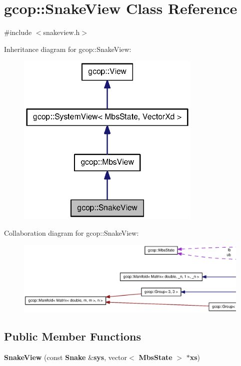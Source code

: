 \section{gcop\-:\-:\-Snake\-View \-Class \-Reference}
\label{classgcop_1_1SnakeView}


{\ttfamily \#include $<$snakeview.\-h$>$}



\-Inheritance diagram for gcop\-:\-:\-Snake\-View\-:\nopagebreak
\begin{figure}[H]
\begin{center}
\leavevmode
\includegraphics[width=250pt]{classgcop_1_1SnakeView__inherit__graph}
\end{center}
\end{figure}


\-Collaboration diagram for gcop\-:\-:\-Snake\-View\-:\nopagebreak
\begin{figure}[H]
\begin{center}
\leavevmode
\includegraphics[width=350pt]{classgcop_1_1SnakeView__coll__graph}
\end{center}
\end{figure}
\subsection*{\-Public \-Member \-Functions}
\begin{DoxyCompactItemize}
\item 
{\bf \-Snake\-View} (const {\bf \-Snake} \&{\bf sys}, vector$<$ {\bf \-Mbs\-State} $>$ $\ast${\bf xs})
\end{DoxyCompactItemize}
